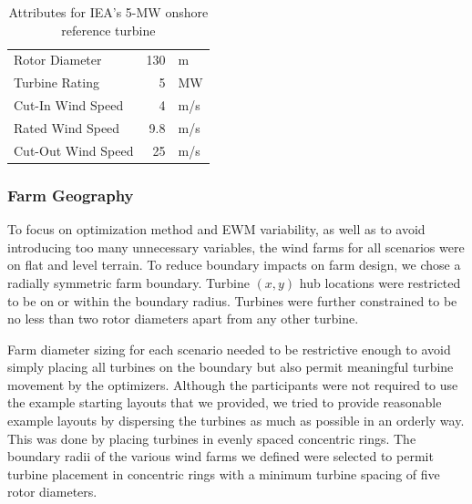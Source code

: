 	\begin{table}[H]
		\begin{center}
			\caption{Attributes for IEA's 5-MW onshore reference turbine}
			\label{tab:turb-att}
			\begin{tabular}{@{}lrl@{}}
			\toprule
				Rotor Diameter & 130 & m \\ 
				Turbine Rating & 5 & MW \\ 
				Cut-In Wind Speed & 4 & m/s \\ 
				Rated Wind Speed & 9.8 & m/s \\ 
				Cut-Out Wind Speed & 25 & m/s \\
			\bottomrule
			\end{tabular}
		\end{center}
	\end{table}
	
\subsubsection{Farm Geography}\label{sec:farmgeog}

	To focus on optimization method and EWM variability, as well as to avoid introducing too many unnecessary variables, the wind farms for all scenarios were on flat and level terrain.
	To reduce boundary impacts on farm design, we chose a radially symmetric farm boundary.
	Turbine $(x, y)$ hub locations were restricted to be on or within the boundary radius.
	Turbines were further constrained to be no less than two rotor diameters apart from any other turbine.

	Farm diameter sizing for each scenario needed to be restrictive enough to avoid simply placing all turbines on the boundary but also permit meaningful turbine movement by the optimizers.
	Although the participants were not required to use the example starting layouts that we provided, we tried to provide reasonable example layouts by dispersing the turbines as much as possible in an orderly way. This was done by placing turbines in evenly spaced concentric rings. The boundary radii of the various wind farms we defined were selected to permit turbine placement in concentric rings with a minimum turbine spacing of five rotor diameters.

